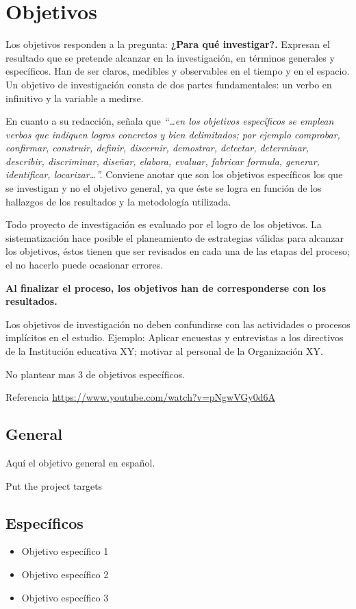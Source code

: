 \chapter{Objetivos}
\label{Objetivos}

Los objetivos responden a la pregunta: \textbf{¿Para qué investigar?.} Expresan el resultado que se pretende alcanzar en la investigación, en términos generales y específicos. Han de ser claros, medibles y observables en el tiempo y en el espacio. Un objetivo de investigación consta de dos partes fundamentales: un verbo en infinitivo y la variable a medirse.

En cuanto a su redacción, \cite{herrera2004tutoria} señala que \textit{ “…en los objetivos específicos se emplean verbos que indiquen logros concretos y bien delimitados; por ejemplo comprobar, confirmar, construir, definir, discernir, demostrar, detectar, determinar, describir, discriminar, diseñar, elabora, evaluar, fabricar formula, generar, identificar, locarizar…”.} Conviene anotar que son los objetivos específicos los que se investigan y no el objetivo general, ya que éste se logra en función de los hallazgos de los resultados y la metodología utilizada.

Todo proyecto de investigación es evaluado por el logro de los objetivos. La sistematización hace posible el planeamiento de estrategias válidas para alcanzar los objetivos, éstos tienen que ser revisados en cada una de las etapas del proceso; el no hacerlo puede ocasionar errores. 

\textbf{Al finalizar el proceso, los objetivos han de corresponderse con los resultados.}

Los objetivos de investigación no deben confundirse con las actividades o procesos 
implícitos en el estudio. Ejemplo: Aplicar encuestas y entrevistas a los directivos de la 
Institución educativa XY; motivar al personal de la Organización XY.

No plantear mas 3 de objetivos específicos.

Referencia \url{https://www.youtube.com/watch?v=pNgwVGy0d6A}

\section{General}
Aquí el objetivo general en español.

Put the project targets


\section{Específicos}
\begin{itemize}
    \item Objetivo específico 1
    \item Objetivo específico 2
    \item Objetivo específico 3
\end{itemize}

